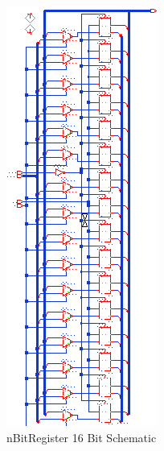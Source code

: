 \documentclass[11pt]{article}
\begin{document}
	
	\begin{figure}[H] 
		\centering 
		\includegraphics[width=0.7\linewidth]{"Pictures/nBitRegister 16-Bit Schematic"}
		\caption{nBitRegister 16 Bit Schematic} 
		\label{fig:nBitRegister-16-Bit-Schematic} 
	\end{figure}
	
\end{document}

